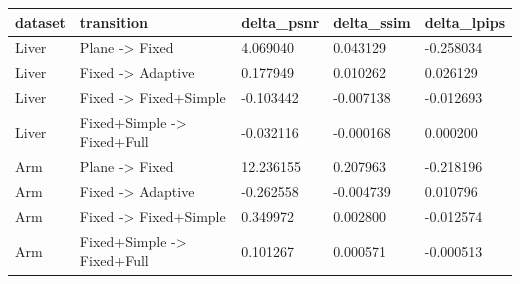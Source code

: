 \begin{tabular}{lllll}
dataset & transition & delta\_psnr & delta\_ssim & delta\_lpips \\
\hline
Liver & Plane -> Fixed & 4.069040 & 0.043129 & -0.258034 \\
Liver & Fixed -> Adaptive & 0.177949 & 0.010262 & 0.026129 \\
Liver & Fixed -> Fixed+Simple & -0.103442 & -0.007138 & -0.012693 \\
Liver & Fixed+Simple -> Fixed+Full & -0.032116 & -0.000168 & 0.000200 \\
Arm & Plane -> Fixed & 12.236155 & 0.207963 & -0.218196 \\
Arm & Fixed -> Adaptive & -0.262558 & -0.004739 & 0.010796 \\
Arm & Fixed -> Fixed+Simple & 0.349972 & 0.002800 & -0.012574 \\
Arm & Fixed+Simple -> Fixed+Full & 0.101267 & 0.000571 & -0.000513 \\
\end{tabular}
